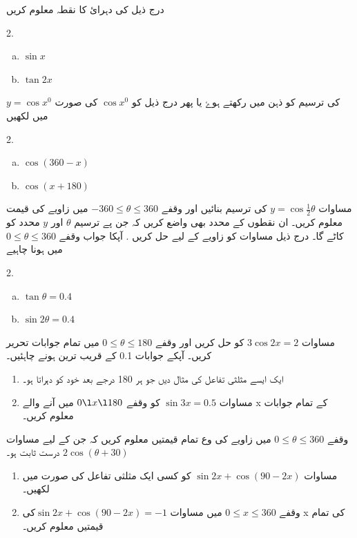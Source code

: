 درج ذیل کی دہرائ کا نقطہ معلوم کریں
\begin{multicols}{2.}
\begin{enumerate}[a.]
\item \(\sin x\)
\item   \(\tan2x \)
\end{enumerate}
\end{multicols}
\( y=\cos x^{0} \)
کی ترسیم کو ذہن میں رکھتے ہوۓ یا پھر درج ذیل کو \( \cos x^{0} \) کی صورت میں لکھیں 
\begin{multicols}{2.}
\begin{enumerate}[a.]
\item  \(\cos(360-x) \)
\item    \(\cos(x+180) \)
\end{enumerate}
\end{multicols}
مساوات \(y=\cos\frac{1}{2}\theta \) کی ترسیم بنائیں اور وقفے \(-360\le \theta\le 360\) میں زاویے کی قیمت معلوم کریں۔ ان نقطوں کے محدد بھی واضع کریں کہ جن پے ترسیم  \( \theta   \) اور \(   y \) محدد کو کاٹے گا۔
درج ذیل مساوات کو زاویے کے لیے حل کریں . آپکا جواب وقفے \(0\le \theta\le 360\) میں ہونا چاہیے 
\begin{multicols}{2.}
\begin {enumerate}[a.]
\item  \(\tan\theta=0.4 \)
\item    \(\sin2\theta=0.4\)
\end{enumerate}
\end{multicols}



مساوات \(3\cos2x=2 \) کو حل کریں اور وقفے \(0\le \theta\le 180\) میں تمام جوابات تحریر کریں۔ آپکے جوابات 0.1 کے قریب ترین ہونے چاہئیں۔
\begin{enumerate}
\item
ایک ایسے مثلثی تفاعل کی مثال دیں جو ہر 180 درجے بعد خود کو دہراتا ہو۔
\item
مساوات  \(\sin3x=0.5 \) کو  وقفے \(0\l x\l 180\) میں آنے والے   x کے تمام جوابات معلوم کریں۔
\end{enumerate}
وقفے \(0\leq\theta\leq360\) میں زاویے کی وع تمام قیمتیں معلوم کریں کہ جن کے لیے مساوات  \(2\cos(\theta+30) \) درست ثابت ہو۔
\begin{enumerate}
\item
مساوات \(\sin2x+\cos(90-2x) \) کو کسی ایک مثلثی تفاعل کی صورت میں لکھیں۔
\item
وقفے \(0\leq x \leq360\) میں مساوات \(\sin2x+\cos(90-2x) =-1\)کی  x کی تمام قیمتیں معلوم کریں۔

\end{enumerate}

